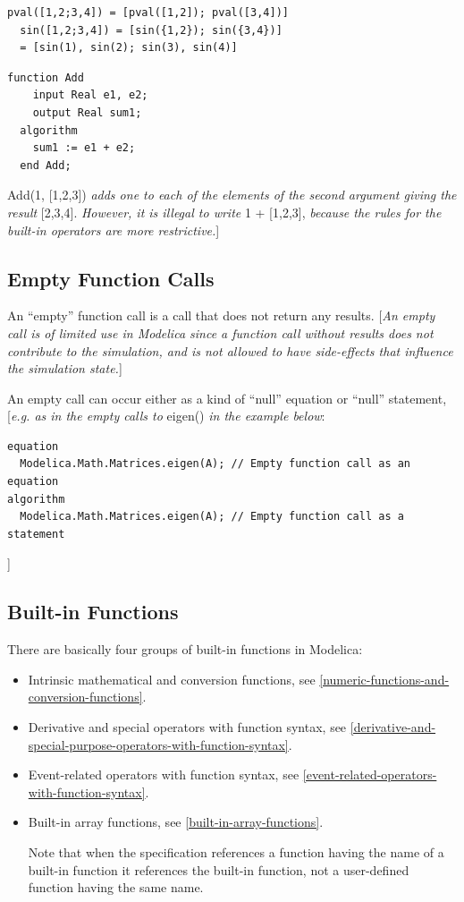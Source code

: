 \documentclass[10pt,a4paper]{report}
\def\doublelabel#1{\label{#1}}
\begin{document}
\begin{lstlisting}[language=modelica]
  pval([1,2;3,4]) = [pval([1,2]); pval([3,4])]
  sin([1,2;3,4]) = [sin({1,2}); sin({3,4})]
  = [sin(1), sin(2); sin(3), sin(4)]
\end{lstlisting}
\begin{lstlisting}[language=modelica]
  function Add
    input Real e1, e2;
    output Real sum1;
  algorithm
    sum1 := e1 + e2;
  end Add;
\end{lstlisting}
Add(1, {[}1,2,3{]}) \emph{adds one to each of the elements of the second
argument giving the result} {[}2,3,4{]}. \emph{However, it is illegal to
write} 1 + {[}1,2,3{]}, \emph{because the rules for the built-in
operators are more restrictive.}{]}

\subsection{Empty Function Calls}\doublelabel{empty-function-calls}

An ``empty'' function call is a call that does not return any results.
{[}\emph{An empty call is of limited use in Modelica since a function
call without results does not contribute to the simulation, and is not
allowed to have side-effects that influence the simulation state.}{]}

An empty call can occur either as a kind of ``null'' equation or
``null'' statement, {[}\emph{e.g. as in the empty calls to} eigen()
\emph{in the example below}:

\begin{lstlisting}[language=modelica]
equation
  Modelica.Math.Matrices.eigen(A); // Empty function call as an equation
algorithm
  Modelica.Math.Matrices.eigen(A); // Empty function call as a statement
\end{lstlisting}
{]}

\subsection{Built-in Functions}\doublelabel{built-in-functions}

There are basically four groups of built-in functions in Modelica:

\begin{itemize}
\item
  Intrinsic mathematical and conversion functions, see \ref{numeric-functions-and-conversion-functions}.
\item
  Derivative and special operators with function syntax, 
  see \ref{derivative-and-special-purpose-operators-with-function-syntax}.
\item
  Event-related operators with function syntax, see \ref{event-related-operators-with-function-syntax}.
\item
  Built-in array functions, see \ref{built-in-array-functions}.

  Note that when the specification references a function having the name
  of a built-in function it references the built-in function, not a
  user-defined function having the same name.
\end{itemize}
\end{document}
